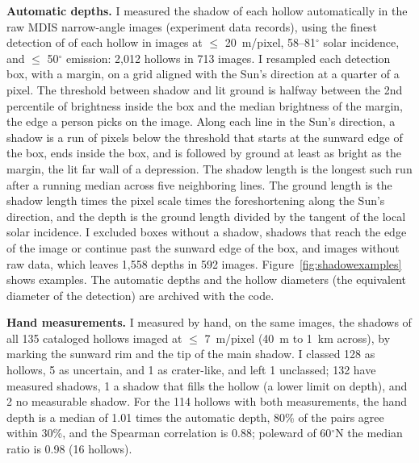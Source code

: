 \documentclass{planetary}
\begin{document}
\textbf{Automatic depths.} I measured the shadow of each hollow automatically in the raw MDIS narrow-angle images (experiment data records), using the finest detection of \textcite{bickel2025} of each hollow in images at $\leq$ 20~m/pixel, 58--81$^\circ$ solar incidence, and $\leq$ 50$^\circ$ emission: 2,012 hollows in 713 images. I resampled each detection box, with a margin, on a grid aligned with the Sun's direction at a quarter of a pixel. The threshold between shadow and lit ground is halfway between the 2nd percentile of brightness inside the box and the median brightness of the margin, the edge a person picks on the image. Along each line in the Sun's direction, a shadow is a run of pixels below the threshold that starts at the sunward edge of the box, ends inside the box, and is followed by ground at least as bright as the margin, the lit far wall of a depression. The shadow length is the longest such run after a running median across five neighboring lines. The ground length is the shadow length times the pixel scale times the foreshortening along the Sun's direction, and the depth is the ground length divided by the tangent of the local solar incidence. I excluded boxes without a shadow, shadows that reach the edge of the image or continue past the sunward edge of the box, and images without raw data, which leaves 1,558 depths in 592 images. Figure~\ref{fig:shadowexamples} shows examples. The automatic depths and the hollow diameters (the equivalent diameter of the detection) are archived with the code.

\textbf{Hand measurements.} I measured by hand, on the same images, the shadows of all 135 cataloged hollows imaged at $\leq$ 7~m/pixel (40~m to 1~km across), by marking the sunward rim and the tip of the main shadow. I classed 128 as hollows, 5 as uncertain, and 1 as crater-like, and left 1 unclassed; 132 have measured shadows, 1 a shadow that fills the hollow (a lower limit on depth), and 2 no measurable shadow. For the 114 hollows with both measurements, the hand depth is a median of 1.01 times the automatic depth, 80\% of the pairs agree within 30\%, and the Spearman correlation is 0.88; poleward of 60$^\circ$N the median ratio is 0.98 (16 hollows).
\end{document}
